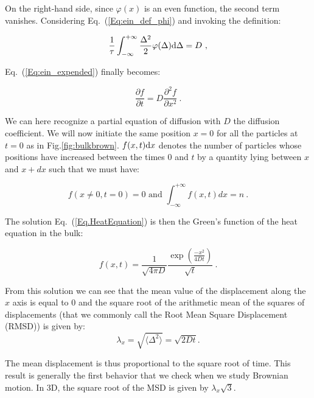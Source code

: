 On the right-hand side, since $\varphi(x)$ is an even function, the second term vanishes. Considering Eq.~(\ref{Eq:ein_def_phi}) and invoking the definition:



\begin{equation}
	\frac{1}{\tau} \int_{-\infty}^{+\infty} \frac{\Delta^2}{2}\varphi(\Delta)\textnormal{d}\Delta = D ~,
\end{equation}

Eq.~(\ref{Eq:ein_expended}) finally becomes:

\begin{equation}
	\frac{\partial f}{\partial t} = D \frac{\partial ^2 f}{\partial x ^2} ~.
	\label{Eq.HeatEquation}
\end{equation}


We can here recognize a partial equation of diffusion with $D$ the diffusion coefficient. We will now initiate the same position $x=0$ for all the particles at $t=0$ as in Fig.\ref{fig:bulkbrown}. $f(x,t)\textnormal{d}x$ denotes the number of particles whose positions have increased between the times  $0$ and $t$  by a quantity lying between $x$ and $x + dx$ such that we must have:

\begin{equation}
	f(x \ne 0, t=0) = 0 \text{ and } \int_{-\infty}^{+\infty}f(x,t)dx = n ~.
\end{equation}

The solution Eq.~(\ref{Eq.HeatEquation}) is then the Green's function of the heat equation in the bulk:


\begin{equation}
f(x,t) = \frac{1}{\sqrt{4\pi D}} \frac{\exp \left(\frac{-x^2}{4Dt} \right)}{\sqrt{t}} ~.
\end{equation}

From this solution we can see that the mean value of the displacement along the $x$ axis is equal to $0$ and the square root of the arithmetic mean of the squares of displacements (that we commonly call the Root Mean Square Displacement (R\gls{MSD}))  is given by:
\begin{equation}
	\lambda _x = \sqrt{\langle \Delta ^2 \rangle} =  \sqrt{2Dt}.
	\label{Eq:MSD_ein}
\end{equation}

The mean displacement is thus proportional to the square root of time. This result is generally the first behavior that we check when we study Brownian motion. In 3D, the square root of the \gls{MSD} is given by $\lambda_x \sqrt{3}$.

